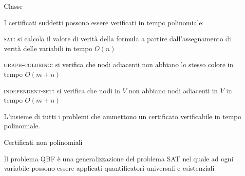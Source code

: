 \begin{frame}{Classe \NP}

I certificati suddetti possono essere verificati in tempo polinomiale:
\BIL
\item \textsc{sat}: si calcola il valore di verità della formula a partire dall'assegnamento di verità delle variabili in tempo $O(n)$
\item \textsc{graph-coloring}: si verifica che nodi adiacenti non abbiano lo stesso
colore in tempo $O(m+n)$
\item \textsc{independent-set}: si verifica che nodi in $V$ non abbiano nodi
adiacenti in $V$ in tempo $O(m+n)$
\EIL

\begin{myboxtitle}[Classe \NP]
L'insieme di tutti i problemi che ammettono un certificato verificabile
in tempo polinomiale.    
\end{myboxtitle}

\end{frame}



\begin{frame}{Certificati non polinomiali}

\vspace{-9pt}
\begin{myboxtitle}
Il problema QBF è una generalizzazione del problema SAT nel quale ad ogni variabile possono essere applicati quantificatori universali e esistenziali
\end{myboxtitle}

\vspace{-3pt}
\end{frame}

